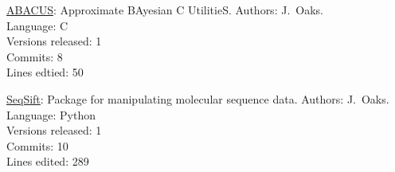 \myHangIndent
\href{https://github.com/joaks1/abacus}{ABACUS}:
    Approximate BAyesian C UtilitieS.
    Authors: J.\ Oaks. \\
    Language: C \\
    Versions released: 1 \\
    Commits: 8 \\
    Lines edtied: 50

\myHangIndent
\href{https://github.com/joaks1/SeqSift}{SeqSift}:
    Package for manipulating molecular sequence data.
    Authors: J.\ Oaks. \\
    Language: Python \\
    Versions released: 1 \\
    Commits: 10 \\
    Lines edited: 289
